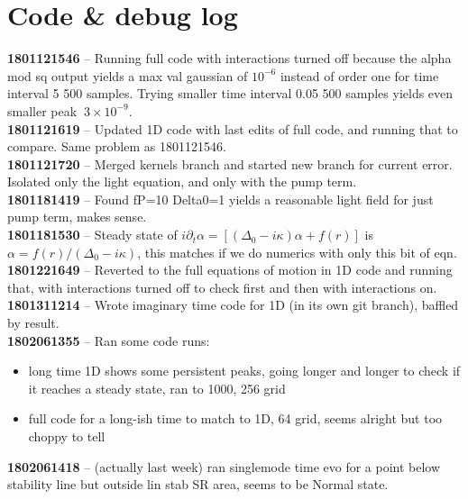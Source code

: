 \documentclass[a4paper,nobalancelastpage]{revtex4-1}
\newcommand{\smtitle}[1]{\textcolor{singlemode}{\textbf{#1}}}
\newcommand{\mmtitle}[1]{\textcolor{multimode}{\textbf{#1}}}
\begin{document}
\section*{Code \& debug log}

\mmtitle{1801121546} -- Running full code with interactions turned off because the alpha mod sq output yields a max val gaussian of $10^{-6}$ instead of order one for time interval 5 500 samples. Trying smaller time interval 0.05 500 samples yields even smaller peak $~3 \times 10^{-9}$.\\

\mmtitle{1801121619} -- Updated 1D code with last edits of full code, and running that to compare. Same problem as 1801121546.\\

\mmtitle{1801121720} -- Merged kernels branch and started new branch for current error. Isolated only the light equation, and only with the pump term.\\

\mmtitle{1801181419} -- Found fP=10 Delta0=1 yields a reasonable light field for just pump term, makes sense. \\

\mmtitle{1801181530} -- Steady state of $i\partial_t \alpha=\left[(\Delta_0-i \kappa) \alpha + f(r) \right]$ is $\alpha=f(r)/(\Delta_0-i \kappa)$, this matches if we do numerics with only this bit of eqn.\\

\mmtitle{1801221649} -- Reverted to the full equations of motion in 1D code and running that, with interactions turned off to check first and then with interactions on. \\

\mmtitle{1801311214} -- Wrote imaginary time code for 1D (in its own git branch), baffled by result.\\

\mmtitle{1802061355} -- Ran some code runs:
\begin{itemize}
\item long time 1D shows some persistent peaks, going longer and longer to check if it reaches a steady state, ran to 1000, 256 grid
\item full code for a long-ish time to match to 1D, 64 grid, seems alright but too choppy to tell
\end{itemize}

\smtitle{1802061418} -- (actually last week) ran singlemode time evo for a point below stability line but outside lin stab SR area, seems to be Normal state.\\
\end{document}
